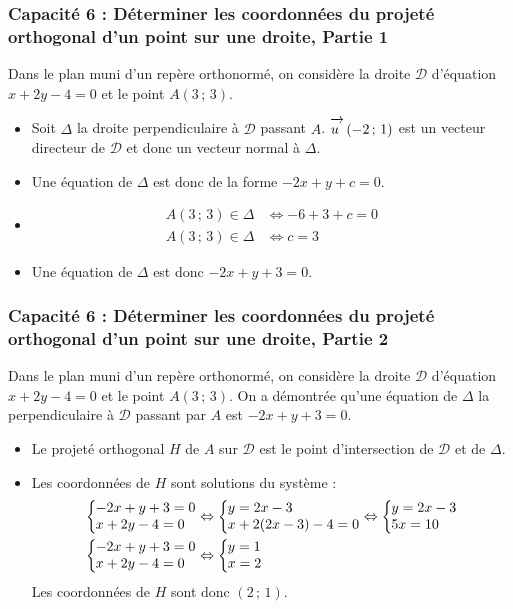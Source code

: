 \documentclass[11pt, hyperref={urlcolor=red,%
            linkcolor=blue, %
            colorlinks=true}]{beamer}
\newcommand{\Coord}[2]{\left(#1\, ;\, #2\right)}
\newcommand{\vect}[1]{\mathchoice%
{\overrightarrow{\displaystyle\mathstrut#1\,\,}}%
{\overrightarrow{\textstyle\mathstrut#1\,\,}}%
{\overrightarrow{\scriptstyle\mathstrut#1\,\,}}%
{\overrightarrow{\scriptscriptstyle\mathstrut#1\,\,}}}
\newcommand{\sys}[2]{
\left\lbrace
 \begin{array}{l}
  \negthickspace\negthickspace #1\\
  \negthickspace\negthickspace #2\\
 \end{array}
\right.\negthickspace\negthickspace}
\begin{document}
\begin{frame}
\label{capacite6}
\frametitle{Capacité 6 : Déterminer les coordonnées du projeté orthogonal d'un point sur une droite, Partie 1}

Dans le plan muni d'un repère orthonormé, on considère la droite $\mathcal{D}$ d'équation $x+2y-4=0$ et le point $A\Coord{3}{3}$.


\begin{itemize}
\pause \item  Soit $\Delta$  la droite perpendiculaire à $\mathcal{D}$ passant $A$. $\vect{u}\Coord{-2}{1}$ est un vecteur directeur de $\mathcal{D}$ et donc un vecteur normal à $\Delta$.
\pause \item  Une équation de $\Delta$  est donc de la forme $-2x+y+c=0$. 
\pause \item 
\begin{align*}
A\Coord{3}{3} \in \Delta &\Leftrightarrow -6+3+c=0 \\
A\Coord{3}{3} \in \Delta &\Leftrightarrow c=3 
\end{align*}
\pause \item Une équation de $\Delta$  est donc $-2x+y+3=0$.
\end{itemize}
\end{frame}




\begin{frame}
\frametitle{Capacité 6 : Déterminer les coordonnées du projeté orthogonal d'un point sur une droite, Partie 2}

Dans le plan muni d'un repère orthonormé, on considère la droite $\mathcal{D}$ d'équation $x+2y-4=0$ et le point $A\Coord{3}{3}$.
On a démontrée qu'une équation de $\Delta$  la perpendiculaire à  $\mathcal{D}$ passant par $A$ est $-2x+y+3=0$.


\begin{itemize}
\pause \item Le projeté orthogonal $H$ de $A$ sur $\mathcal{D}$ est le point d'intersection de $\mathcal{D}$ et de $\Delta$.
\pause \item Les coordonnées de  $H$ sont solutions du système :
\begin{align*}
\sys{-2x+y+3=0}{x+2y-4=0}  &\Leftrightarrow \sys{y=2x-3}{x+2(2x-3)-4=0} \Leftrightarrow \sys{y=2x-3}{5x=10} \\
\sys{-2x+y+3=0}{x+2y-4=0}  &\Leftrightarrow  \sys{y=1}{x=2} 
\end{align*}
Les coordonnées de $H$ sont donc $\Coord{2}{1}$.
\end{itemize}
\end{frame}
\end{document}
